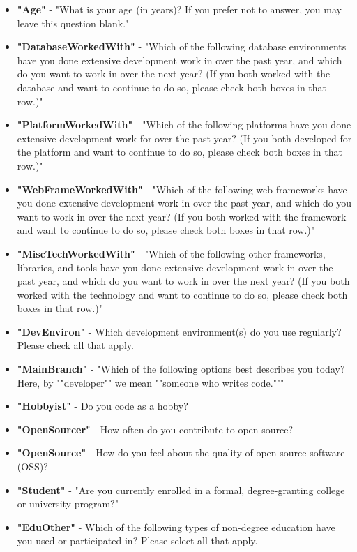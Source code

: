 \begin{appendices}
\begin{itemize}
        \item \textbf{"Age"} - "What is your age (in years)? If you prefer not to answer, you may leave this question blank."
        \item \textbf{"DatabaseWorkedWith"} - "Which of the following database environments have you done extensive development work in over the past year, and which do you want to work in over the next year?   (If you both worked with the database and want to continue to do so, please check both boxes in that row.)"
        \item \textbf{"PlatformWorkedWith"} - "Which of the following platforms have you done extensive development work for over the past year?   (If you both developed for the platform and want to continue to do so, please check both boxes in that row.)"
        \item \textbf{"WebFrameWorkedWith"} - "Which of the following web frameworks have you done extensive development work in over the past year, and which do you want to work in over the next year? (If you both worked with the framework and want to continue to do so, please check both boxes in that row.)"
        \item \textbf{"MiscTechWorkedWith"} - "Which of the following other frameworks, libraries, and tools have you done extensive development work in over the past year, and which do you want to work in over the next year? (If you both worked with the technology and want to continue to do so, please check both boxes in that row.)"
        \item \textbf{"DevEnviron"} - Which development environment(s) do you use regularly? Please check all that apply.
        \item \textbf{"MainBranch"} - "Which of the following options best describes you today? Here, by ""developer"" we mean ""someone who writes code."""
        \item \textbf{"Hobbyist"} - Do you code as a hobby?
        \item \textbf{"OpenSourcer"} - How often do you contribute to open source?
        \item \textbf{"OpenSource"} - How do you feel about the quality of open source software (OSS)?
        \item \textbf{"Student"} - "Are you currently enrolled in a formal, degree-granting college or university program?"
        \item \textbf{"EduOther"} - Which of the following types of non-degree education have you used or participated in? Please select all that apply.

\end{itemize}
\end{appendices}
